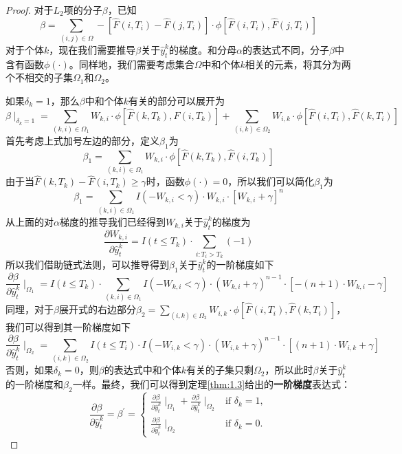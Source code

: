 \begin{proof}
对于$L_2$项的分子$\beta$，已知$$\beta = \sum_{(i,j)\in \Omega} -\left[\hat{F}(i, T_i) - \hat{F}(j, T_i)\right] \cdot \phi\left[ \hat{F}(i, T_i), \hat{F}(j, T_i) \right]$$ 对于个体$k$，现在我们需要推导$\beta$关于$\hat{y}_t^k$的梯度。和分母$\alpha$的表达式不同，分子$\beta$中含有函数$\phi(\cdot)$。同样地，我们需要考虑集合$\Omega$中和个体$k$相关的元素，将其分为两个不相交的子集$\Omega_1$和$\Omega_2$。

如果$\delta_k = 1$，那么$\beta$中和个体$k$有关的部分可以展开为$$\beta \mid_{\delta_k=1}=\sum_{(k,i)\in \Omega_1} W_{k,i}\cdot \phi\left[ \hat{F}(k, T_k), \hat{F}(i, T_k) \right] + \sum_{(i,k)\in \Omega_2} W_{i,k}\cdot \phi\left[ \hat{F}(i, T_i), \hat{F}(k, T_i) \right] $$ 首先考虑上式加号左边的部分，定义$\beta_1$为$$\beta_1 = \sum_{(k,i)\in \Omega_1} W_{k,i}\cdot \phi\left[ \hat{F}(k, T_k), \hat{F}(i, T_k) \right]$$ 由于当$\hat{F}(k, T_k) - \hat{F}(i, T_k) \ge \gamma$时，函数$\phi(\cdot)=0$，所以我们可以简化$\beta_1$为$$\beta_1 = \sum_{(k,i)\in \Omega_1} I(-W_{k,i} < \gamma) \cdot W_{k,i}\cdot [W_{k,i} + \gamma]^n $$ 从上面的对$\alpha$梯度的推导我们已经得到$W_{k,i}$关于$\hat{y}_t^k$的梯度为$$\frac{\partial W_{k,i}}{\partial \hat{y}_t^k} = I(t\le T_k)\cdot {\sum\limits_{i: T_i>T_k}(-1)}$$ 所以我们借助链式法则，可以推导得到$\beta_1$关于$\hat{y}_t^k$的一阶梯度如下$$
\frac{\partial \beta}{\partial \hat{y}_t^k} \mid_{\Omega_1} = I(t\le T_k)\cdot \sum\limits_{(k,i)\in \Omega_1} {I(-W_{k,i}<\gamma)\cdot (W_{k,i}+\gamma)^{n-1}\cdot [-(n+1)\cdot W_{k,i}-\gamma]}
$$ 同理，对于$\beta$展开式的右边部分$\beta_2=\sum_{(i,k)\in \Omega_2} W_{i,k}\cdot \phi\left[ \hat{F}(i, T_i), \hat{F}(k, T_i) \right]$，我们可以得到其一阶梯度如下$$
\frac{\partial \beta}{\partial \hat{y}_t^k} \mid_{\Omega_2} = \sum\limits_{(i,k)\in \Omega_2} {I(t\le T_i)\cdot I(-W_{i,k}<\gamma)\cdot (W_{i,k}+\gamma)^{n-1}\cdot [(n+1)\cdot W_{i,k}+\gamma]}
$$ 否则，如果$\delta_k = 0$，则$\beta$的表达式中和个体$k$有关的子集只剩$\Omega_2$，所以此时$\beta$关于$\hat{y}_t^k$的一阶梯度和$\beta_2$一样。最终，我们可以得到定理\ref{thm:1.3}给出的\textbf{一阶梯度}表达式：$$
\frac{\partial \beta}{\partial \hat{y}_t^k}=\beta^{'}=
\begin{cases}
\frac{\partial \beta}{\partial \hat{y}_t^k} \mid_{\Omega_1} + \frac{\partial \beta}{\partial \hat{y}_t^k} \mid_{\Omega_2} & \text{if } \delta_k = 1,\\
\frac{\partial \beta}{\partial \hat{y}_t^k} \mid_{\Omega_2} & \text{if } \delta_k = 0.
\end{cases}
$$


\end{proof}
